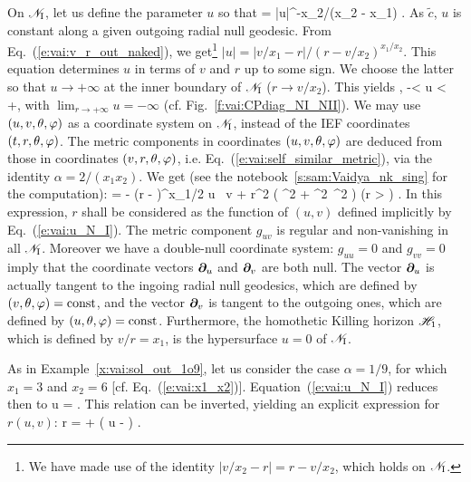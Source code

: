 On $\mathscr{N}_{\rm I}$, let us define the parameter $u$ so that
\be \label{e:vai:def_u_tilde_c}
     = |u|^{-x_2/(x_2 - x_1)} .
\ee
As $\tilde{c}$, $u$ is constant along a given outgoing radial null geodesic.
From Eq.~(\ref{e:vai:v_r_out_naked}), we get\footnote{We have made use of
the identity $|v/x_2 - r| = r - v/x_2$, which holds on $ \mathscr{N}_{\rm I}$.}
$|u| = |v/x_1 - r| / (r - v/x_2)^{x_1/x_2}$. This equation determines
$u$ in terms of $v$ and $r$ up to some sign. We choose the latter so that
$u \to +\infty$ at the inner boundary of $\mathscr{N}_{\rm I}$
($r \to v/x_2$). This yields
\be \label{e:vai:u_N_I}
    , \quad -\infty < u < +\infty ,
\ee
with $\lim_{r\to +\infty} u = - \infty$ (cf. Fig.~\ref{f:vai:CPdiag_NI_NII}).
We may use $(u, v, \theta, \varphi)$ as a coordinate system on $\mathscr{N}_{\rm I}$,
instead of the IEF coordinates $(t, r, \theta, \varphi)$.
The metric components in coordinates $(u, v, \theta, \varphi)$
are deduced from those in coordinates $(v, r, \theta, \varphi)$, i.e.
Eq.~(\ref{e:vai:self_similar_metric}), via
the identity $\alpha=2/(x_1 x_2)$. We get
(see the notebook~\ref{s:sam:Vaidya_nk_sing} for the computation):
\be \label{e:vai:metric_N_I}
     = -  \left(r -  \right)^{x_1/2}
        \dd u \, \dd v
        + r^2 \left( \dd\th^2 + \sin^2\th\, \dd\ph^2 \right) \qquad
        \left(r > \right) .
\ee
In this expression, $r$ shall be considered as the function of $(u,v)$ defined
implicitly by Eq.~(\ref{e:vai:u_N_I}).
The metric component $g_{uv}$ is regular and non-vanishing in all $\mathscr{N}_{\rm I}$.
Moreover we have a double-null coordinate system:
$g_{uu} = 0$ and $g_{vv} = 0$ imply that the coordinate vectors $\bm{\partial}_u$
and $\bm{\partial}_v$ are both null. The vector $\bm{\partial}_u$ is actually tangent to the
ingoing radial null geodesics, which are defined by $(v,\theta,\varphi) = \mathrm{const}$,
and the vector $\bm{\partial}_v$ is tangent to the outgoing ones, which are defined
by $(u,\theta,\varphi) = \mathrm{const}$. Furthermore, the homothetic Killing horizon $\mathscr{H}_1$, which is defined by $v/r = x_1$, is the hypersurface
$u = 0$ of $\mathscr{N}_{\rm I}$.


\begin{example} \label{x:vai:u_r_1o9}
As in Example~\ref{x:vai:sol_out_1o9}, let us consider the case $\alpha=1/9$,
for which $x_1 = 3$ and $x_2 = 6$ [cf. Eq.~(\ref{e:vai:x1_x2})]. Equation~(\ref{e:vai:u_N_I})
reduces then to
\be
    u =  .
\ee
This relation can be inverted, yielding an explicit expression for $r(u, v)$:
\be \label{e:vai:r_uv_1o9}
    r =  +  \left( u -  \right) .
\ee
\end{example}

